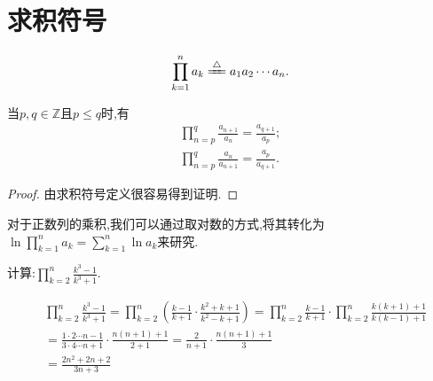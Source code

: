 \documentclass[../../main.tex]{subfiles}
\begin{document}
\section{求积符号}

\begin{definition}[求积符号]\label{definition:求积符号}
\begin{align*}
\prod_{k=1}^n{a_k}\xlongequal{\bigtriangleup}a_1a_2\cdots a_n. 
\end{align*}
\end{definition}

\begin{theorem}[基本结论]\label{theorem:求积符号基本结论}
当$p,q\in \mathbb{Z}$且$p\leqslant  q$时,有
\begin{gather*}
\prod_{n=p}^q{\frac{a_{n+1}}{a_n}}=\frac{a_{q+1}}{a_p};
\\
\prod_{n=p}^q{\frac{a_n}{a_{n+1}}}=\frac{a_p}{a_{q+1}}.
\end{gather*}
\end{theorem}
\begin{proof}
由求积符号定义很容易得到证明.

\end{proof}
\begin{remark}
对于正数列的乘积,我们可以通过取对数的方式,将其转化为$\ln \prod_{k=1}^n{a_k}=\sum\limits_{k=1}^n{\ln a_k}$来研究.
\end{remark}
\begin{example}
计算:$\prod_{k=2}^n{\frac{k^3-1}{k^3+1}}$.
\end{example}
\begin{solution}
\begin{align*}
&\prod_{k=2}^n{\frac{k^3-1}{k^3+1}}=\prod_{k=2}^n{\left( \frac{k-1}{k+1}\cdot \frac{k^2+k+1}{k^2-k+1} \right)}=\prod_{k=2}^n{\frac{k-1}{k+1}\cdot}\prod_{k=2}^n{\frac{k\left( k+1 \right) +1}{k\left( k-1 \right) +1}}
\\
&=\frac{1\cdot 2\cdots n-1}{3\cdot 4\cdots n+1}\cdot \frac{n\left( n+1 \right) +1}{2+1}=\frac{2}{n+1}\cdot \frac{n\left( n+1 \right) +1}{3}
\\
&=\frac{2n^2+2n+2}{3n+3}
\end{align*}

\end{solution}
\end{document}
